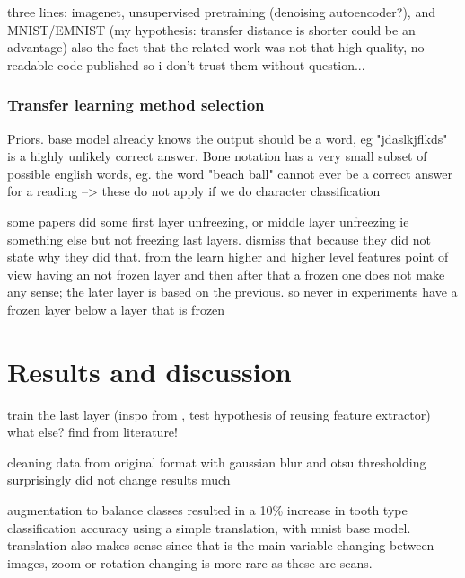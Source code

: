 \documentclass{article}
\begin{document}
three lines: imagenet, unsupervised pretraining (denoising autoencoder?), and MNIST/EMNIST (my hypothesis: transfer distance is shorter could be an advantage)
also the fact that the related work was not that high quality, no readable code published so i don't trust them without question...

\subsubsection{Transfer learning method selection}
Priors. base model already knows the output should be a word, eg "jdaslkjflkds" is a highly unlikely
correct answer.
Bone notation has a very small subset of possible english words, eg. the word "beach ball" cannot ever be a correct 
answer for a reading
--> these do not apply if we do character classification

some papers did some first layer unfreezing, or middle layer unfreezing ie something else 
but not freezing last layers. dismiss that because 
they did not state why they did that. from the learn higher and higher level features point of view 
having an not frozen layer and then after that a frozen one does not make any sense; the later 
layer is based on the previous. so never in experiments have a frozen layer below a layer that is frozen


\section{Results and discussion}



train the last layer (inspo from \cite{tibetan_ocr}, test hypothesis of reusing feature extractor)
what else? find from literature!

cleaning data from original format with gaussian blur and otsu thresholding surprisingly did not 
change results much 

augmentation to balance classes resulted in a 10\% increase in tooth type classification accuracy 
using a simple translation, with mnist base model. translation also makes sense since that is the main variable changing 
between images, zoom or rotation changing is more rare as these are scans.
\end{document}
